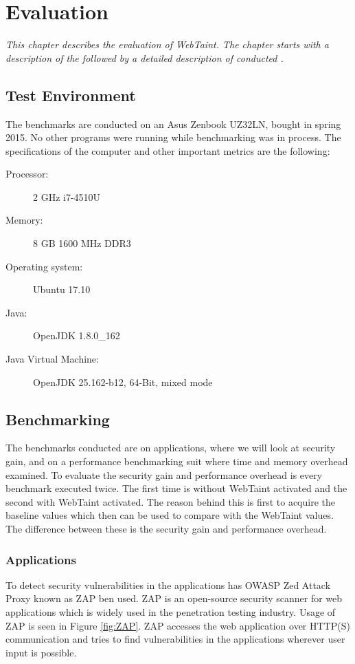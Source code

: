 \chapter{Evaluation}
\label{Evaluation}
\textit{This chapter describes the evaluation of WebTaint. The chapter starts with a description of the \textit{} followed by a detailed description of conducted \textit{}.}



\section{Test Environment}
\label{TestEnvironment}
The benchmarks are conducted on an Asus Zenbook UZ32LN, bought in spring 2015. No other programs were running while benchmarking was in process. The specifications of the computer and other important metrics are the following:

\begin{description}
    \item [Processor:] 2 GHz i7-4510U
    \item [Memory:] 8 GB 1600 MHz DDR3
    \item [Operating system:] Ubuntu 17.10
    \item [Java:] OpenJDK 1.8.0\_162
    \item [Java Virtual Machine:] OpenJDK 25.162-b12, 64-Bit, mixed mode
\end{description}



\section{Benchmarking}
\label{Benchmarking}
The benchmarks conducted are on applications, where we will look at security gain, and on a performance benchmarking suit where time and memory overhead examined. To evaluate the security gain and performance overhead is every benchmark executed twice. The first time is without WebTaint activated and the second with WebTaint activated. The reason behind this is first to acquire the baseline values which then can be used to compare with the WebTaint values. The difference between these is the security gain and performance overhead.



\subsection{Applications}
To detect security vulnerabilities in the applications has OWASP Zed Attack Proxy \parencite{zap} known as ZAP ben used. ZAP is an open-source security scanner for web applications which is widely used in the penetration testing industry. Usage of ZAP is seen in Figure \ref{fig:ZAP}. ZAP accesses the web application over HTTP(S) communication and tries to find vulnerabilities in the applications wherever user input is possible.

